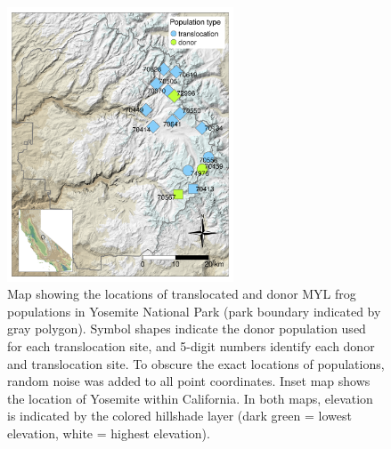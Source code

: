 \documentclass[9pt,twoside,lineno]{pnas-new-SI}
\begin{document}
\begin{figure}

{\centering \includegraphics[width=0.60\textwidth]{figures/map_translocation_points.png}

}

\caption{\label{fig-yosemap}Map showing the locations of translocated
and donor MYL frog populations in Yosemite National Park (park boundary
indicated by gray polygon). Symbol shapes indicate the donor population
used for each translocation site, and 5-digit numbers identify each
donor and translocation site. To obscure the exact locations of
populations, random noise was added to all point coordinates. Inset map
shows the location of Yosemite within California. In both maps,
elevation is indicated by the colored hillshade layer (dark green =
lowest elevation, white = highest elevation).}

\end{figure}\clearpage

\newpage
\end{document}
